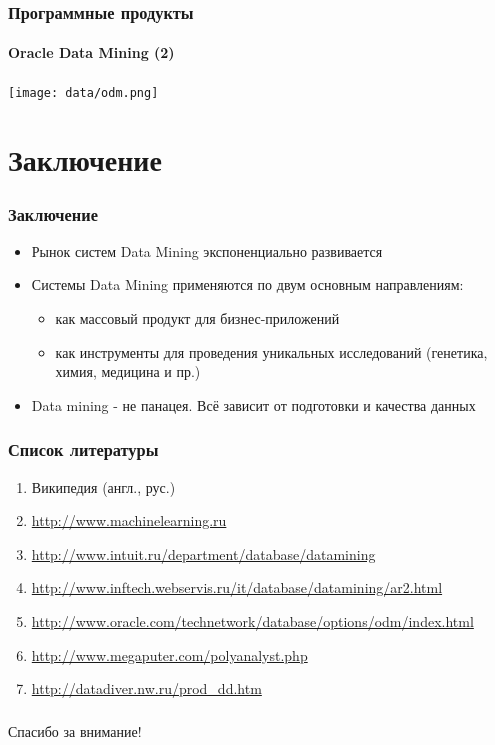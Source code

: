 \documentclass[xcolor=table]{beamer}
\begin{document}
\begin{frame}
  \frametitle{Программные продукты}
  \framesubtitle{Oracle Data Mining (2)}
  \begin{center}
    \texttt{[image: data/odm.png]}
  \end{center}
\end{frame}


\section*{Заключение}
\begin{frame}
  \frametitle{Заключение}

  \begin{itemize}
    \item Рынок систем Data Mining экспоненциально развивается
    \item Системы Data Mining применяются по двум основным направлениям:
      \begin{itemize}
        \item как массовый продукт для бизнес-приложений
        \item как инструменты для проведения уникальных исследований (генетика, химия, медицина и пр.)
      \end{itemize}
    \item Data mining - не панацея. Всё зависит от подготовки и качества данных
  \end{itemize}
\end{frame}

\begin{frame}
  \frametitle{Список литературы}

  \begin{enumerate}
    \item Википедия (англ., рус.)
    \item \url{http://www.machinelearning.ru}
    \item \url{http://www.intuit.ru/department/database/datamining}
    \item \url{http://www.inftech.webservis.ru/it/database/datamining/ar2.html}
    \item \url{http://www.oracle.com/technetwork/database/options/odm/index.html}
    \item \url{http://www.megaputer.com/polyanalyst.php}
    \item \url{http://datadiver.nw.ru/prod_dd.htm}
  \end{enumerate}
\end{frame}


\begin{frame}
  \frametitle{}
  \framesubtitle{}

  \begin{center}\LARGE{Спасибо за внимание!}\end{center}
\end{frame}
\end{document}
